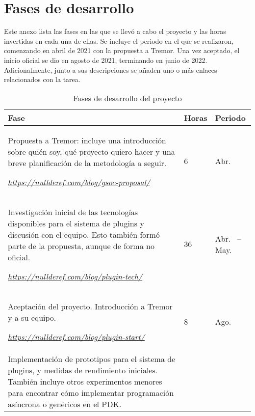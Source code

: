 
\chapter{Fases de desarrollo}\label{annex:hours}

Este anexo lista las fases en las que se llevó a cabo el proyecto y las horas
invertidas en cada una de ellas. Se incluye el periodo en el que se realizaron,
comenzando en abril de 2021 con la propuesta a Tremor. Una vez aceptado, el
inicio oficial se dio en agosto de 2021, terminando en junio de 2022.
Adicionalmente, junto a sus descripciones se añaden uno o más enlaces
relacionados con la tarea.


\begin{longtable}[H]{| m{9.7cm} | P{1.3cm} | P{3.4cm} |}
\caption{Fases de desarrollo del proyecto}\\

\hline
\textbf{Fase}
    & \textbf{Horas}
    & \textbf{Periodo} \\
\hline
\endhead

Propuesta a Tremor: incluye una introducción sobre quién soy, qué proyecto
quiero hacer y una breve planificación de la metodología a seguir.

\vspace{4mm}
\emph{\url{https://nullderef.com/blog/gsoc-proposal/}}
    & 6
    & Abr.~ \\

\hline
Investigación inicial de las tecnologías disponibles para el sistema de
plugins y discusión con el equipo. Esto también formó parte de la propuesta,
aunque de forma no oficial.

\vspace{4mm}
\emph{\url{https://nullderef.com/blog/plugin-tech/}}
    & 36
    & Abr.~ -- May.~ \\

\hline
Aceptación del proyecto. Introducción a Tremor y a su equipo.

\vspace{4mm}
\emph{\url{https://nullderef.com/blog/plugin-start/}}
    & 8
    & Ago.~ \\

\hline
Implementación de prototipos para el sistema de plugins, y medidas de
rendimiento iniciales. También incluye otros experimentos menores para encontrar
cómo implementar programación asíncrona o genéricos en el PDK.


\end{longtable}
